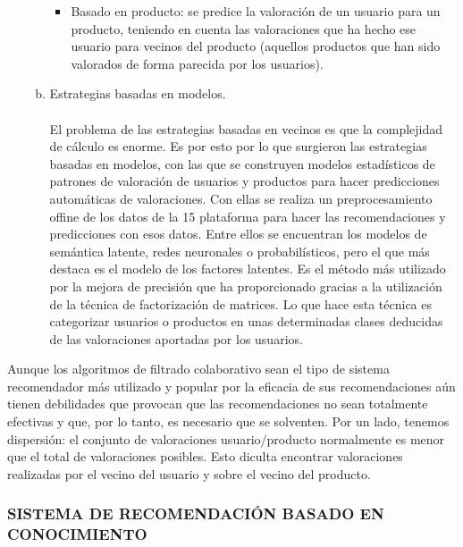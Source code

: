 \documentclass[11pt,a4paper]{article}
\begin{document}
\begin{enumerate}[A.]
\begin{enumerate}[a.]
\begin{itemize}
	 					\item Basado en producto: se predice la valoración de un usuario para un producto, teniendo en cuenta las valoraciones que ha hecho ese usuario para vecinos del producto (aquellos productos que han sido valorados de forma parecida por los usuarios). 
	 				\end{itemize}
	 				\newpage
	 				\item Estrategias basadas en modelos. \\
	 				\\
	 				El problema de las estrategias basadas en vecinos es que la complejidad de cálculo es enorme. Es por esto por lo que surgieron las estrategias basadas en modelos, con las que se construyen modelos estadísticos de patrones de valoración de usuarios y productos para hacer predicciones automáticas de valoraciones. Con ellas se realiza un preprocesamiento offine de los datos de la 15 plataforma para hacer las recomendaciones y predicciones con esos datos. Entre ellos se encuentran los modelos de semántica latente, redes neuronales o probabilísticos, pero el que más destaca es el modelo de los factores latentes. Es el método más utilizado por la mejora de precisión que ha proporcionado gracias a la utilización de la técnica de factorización de matrices. Lo que hace esta técnica es categorizar usuarios o productos en unas determinadas clases deducidas de las valoraciones aportadas por los usuarios.
	 				
	 			\end{enumerate}

\end{enumerate}
	 		Aunque los algoritmos de filtrado colaborativo sean el tipo de sistema recomendador más utilizado y popular por la eficacia de sus recomendaciones aún tienen debilidades que provocan que las recomendaciones no sean totalmente efectivas y que, por lo tanto, es necesario que se solventen. Por un lado, tenemos dispersión: el conjunto de valoraciones usuario/producto normalmente es menor que el total de valoraciones posibles. Esto diculta encontrar valoraciones realizadas por el vecino del usuario y sobre el vecino del producto.\cite{nro1:Online}
		 
		 \subsubsection{SISTEMA DE RECOMENDACIÓN BASADO EN CONOCIMIENTO }
		 
\end{document}
